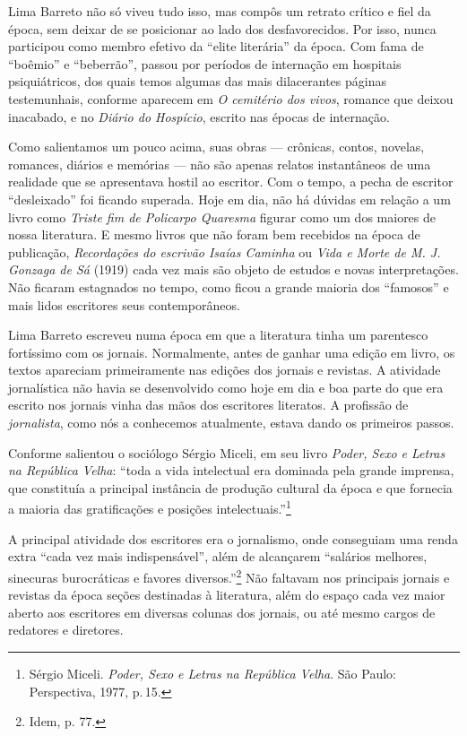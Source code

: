 \documentclass[11pt]{extarticle}
\begin{document}
Lima Barreto não só viveu tudo isso, mas compôs um retrato crítico e
fiel da época, sem deixar de se posicionar ao lado dos desfavorecidos.
Por isso, nunca participou como membro efetivo da ``elite literária'' da
época. Com fama de ``boêmio'' e ``beberrão'', passou por períodos de
internação em hospitais psiquiátricos, dos quais temos algumas das mais
dilacerantes páginas testemunhais, conforme aparecem em \emph{O
cemitério dos vivos}, romance que deixou inacabado, e no \emph{Diário do
Hospício}, escrito nas épocas de internação.

Como salientamos um pouco acima, suas obras --- crônicas, contos,
novelas, romances, diários e memórias --- não são apenas relatos
instantâneos de uma realidade que se apresentava hostil ao escritor. Com
o tempo, a pecha de escritor ``desleixado'' foi ficando superada. Hoje
em dia, não há dúvidas em relação a um livro como \emph{Triste fim de
Policarpo Quaresma} figurar como um dos maiores de nossa literatura. E
mesmo livros que não foram bem recebidos na época de publicação,
\emph{Recordações do escrivão Isaías Caminha} ou \emph{Vida e Morte de
M. J. Gonzaga de Sá} (1919) cada vez mais são objeto de estudos e novas
interpretações. Não ficaram estagnados no tempo, como ficou a grande
maioria dos ``famosos'' e mais lidos escritores seus contemporâneos.

Lima Barreto escreveu numa época em que a literatura tinha um parentesco
fortíssimo com os jornais. Normalmente, antes de ganhar uma edição em
livro, os textos apareciam primeiramente nas edições dos jornais e
revistas. A atividade jornalística não havia se desenvolvido como hoje
em dia e boa parte do que era escrito nos jornais vinha das mãos dos
escritores literatos. A profissão de \emph{jornalista}, como nós a
conhecemos atualmente, estava dando os primeiros passos.

Conforme salientou o sociólogo Sérgio Miceli, em seu livro \emph{Poder,
Sexo e Letras na República Velha}: ``toda a vida intelectual era
dominada pela grande imprensa, que constituía a principal instância de
produção cultural da época e que fornecia a maioria das gratificações e
posições intelectuais.''\footnote{Sérgio Miceli. \emph{Poder, Sexo e
  Letras na República Velha}. São Paulo: Perspectiva, 1977, p.\,15.}

A principal atividade dos escritores era o jornalismo, onde conseguiam
uma renda extra ``cada vez mais indispensável'', além de alcançarem
``salários melhores, sinecuras burocráticas e favores
diversos.''\footnote{Idem, p. 77.} Não faltavam nos principais jornais e
revistas da época seções destinadas à literatura, além do espaço cada
vez maior aberto aos escritores em diversas colunas dos jornais, ou até
mesmo cargos de redatores e diretores.
\end{document}
